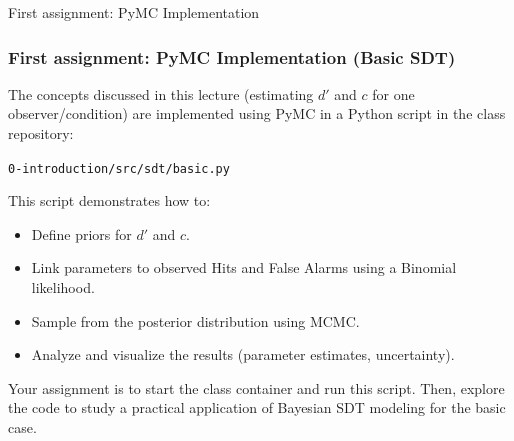 \documentclass[aspectratio=169]{beamer}
\begin{document}
\begin{frame}{First assignment: PyMC Implementation}
  \frametitle{First assignment: PyMC Implementation (Basic SDT)}

  The concepts discussed in this lecture (estimating $d'$ and $c$ for one observer/condition) are implemented using PyMC in a Python script in the class repository:

  \begin{center}
    \texttt{0-introduction/src/sdt/basic.py}
  \end{center}

  This script demonstrates how to:
  \begin{itemize}
    \item Define priors for $d'$ and $c$.
    \item Link parameters to observed Hits and False Alarms using a Binomial likelihood.
    \item Sample from the posterior distribution using MCMC.
    \item Analyze and visualize the results (parameter estimates, uncertainty).
  \end{itemize}

  Your assignment is to start the class container and run this script. Then, explore the code to study a practical application of Bayesian SDT modeling for the basic case.
\end{frame}

\maketitle
\end{document}

